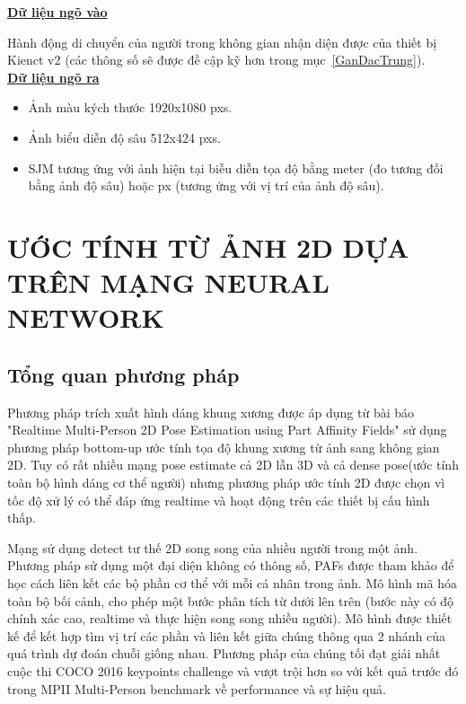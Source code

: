 \underline{\textbf{Dữ liệu ngõ vào}}

Hành động di chuyển của người trong không gian nhận diện được của thiết bị Kienct v2 (các thông số sẽ được đề cập kỹ hơn trong mục~\ref{GanDacTrung}).\\

\underline{\textbf{Dữ liệu ngõ ra}}
\begin{itemize}
\item Ảnh màu kých thước 1920x1080 pxs.

\item Ảnh biểu diễn độ sâu 512x424 pxs.

\item SJM tương ứng với ảnh hiện tại biễu diễn tọa độ bằng meter (đo tương đối bằng ảnh độ sâu) hoặc px (tương ứng với vị trí của ảnh độ sâu).
\end{itemize}

\section{ƯỚC TÍNH TỪ ẢNH 2D DỰA TRÊN MẠNG NEURAL NETWORK}
\label{ss:2Dpose}
\subsection{Tổng quan phương pháp}
\label{sss:tong_quan_2D_pose}
Phương pháp trích xuất hình dáng khung xương được áp dụng từ bài báo "Realtime Multi-Person 2D Pose Estimation using Part Affinity Fields" \cite{cao2017realtime} sử dụng phương pháp bottom-up ước tính tọa độ khung xương từ ảnh sang không gian 2D. Tuy có rất nhiều mạng pose estimate cả 2D lẫn 3D và cả dense pose(ước tính toàn bộ hình dáng cơ thể người) nhưng phương pháp ước tính 2D được chọn vì tốc độ xử lý có thể đáp ứng realtime và hoạt động trên các thiết bị cấu hình thấp.

Mạng sử dụng  detect tư thế 2D song song của nhiều người trong một ảnh. Phương pháp sử dụng một đại diện không có thông số, PAFs được tham khảo để học cách liên kết các bộ phần cơ thể với mỗi cá nhân trong ảnh. Mô hình mã hóa toàn bộ bối cảnh, cho phép một bước phân tích từ dưới lên trên (bước này có độ chính xác cao, realtime và thực hiện song song nhiều người). Mô hình được thiết kế để kết hợp tìm vị trí các phần và liên kết giữa chúng thông qua 2 nhánh của quá trình dự đoán chuỗi giống nhau. Phương pháp của chúng tối đạt giải nhất cuộc thi COCO 2016 keypoints challenge và vượt trội hơn so với kết quả trước đó trong MPII Multi-Person benchmark về performance và sự hiệu quả.

